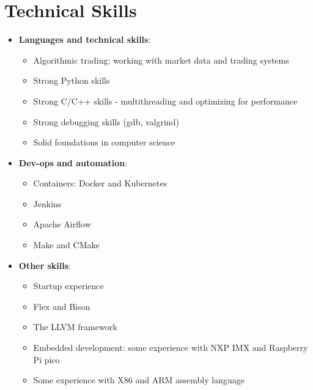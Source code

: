 \documentclass[letterpaper,11pt]{article}
\begin{document}
\section{Technical Skills}
\scriptsize
\begin{itemize}[leftmargin=0.1in, label={}]
\item{\textbf{Languages and technical skills}}:
   \begin{itemize}
      \item Algorithmic trading: working with market data and trading systems
      \item Strong Python skills
      \item Strong C/C++ skills - multithreading and optimizing for performance
      \item Strong debugging skills (gdb, valgrind)
      \item Solid foundations in computer science
   \end{itemize}
   \vspace{2pt}
\item{\textbf{Dev-ops and automation}}:
   \begin{itemize}
      \item Containers: Docker and Kubernetes
      \item Jenkins
      \item Apache Airflow
      \item Make and CMake
   \end{itemize}
   \vspace{2pt}
\item{\textbf{Other skills}}:
   \begin{itemize}
      \item Startup experience
      \item Flex and Bison
      \item The LLVM framework
      \item Embedded development: some experience with NXP IMX and Raspberry Pi pico
      \item Some experience with X86 and ARM assembly language
   \end{itemize}
\end{itemize}
\normalsize
\vspace{-5pt}

\end{document}
